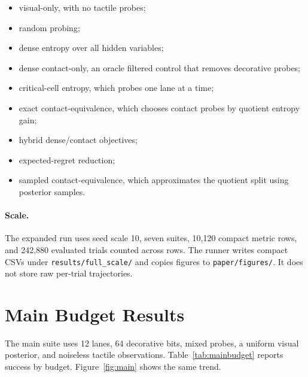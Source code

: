\documentclass{article}
\begin{document}
\begin{itemize}
    \item visual-only, with no tactile probes;
    \item random probing;
    \item dense entropy over all hidden variables;
    \item dense contact-only, an oracle filtered control that removes decorative probes;
    \item critical-cell entropy, which probes one lane at a time;
    \item exact contact-equivalence, which chooses contact probes by quotient entropy gain;
    \item hybrid dense/contact objectives;
    \item expected-regret reduction;
    \item sampled contact-equivalence, which approximates the quotient split using posterior samples.
\end{itemize}

\paragraph{Scale.}
The expanded run uses seed scale 10, seven suites, 10,120 compact metric rows, and 242,880 evaluated trials counted across rows. The runner writes compact CSVs under \texttt{results/full\_scale/} and copies figures to \texttt{paper/figures/}. It does not store raw per-trial trajectories.

\section{Main Budget Results}

The main suite uses 12 lanes, 64 decorative bits, mixed probes, a uniform visual posterior, and noiseless tactile observations. Table~\ref{tab:mainbudget} reports success by budget. Figure~\ref{fig:main} shows the same trend.
\end{document}
